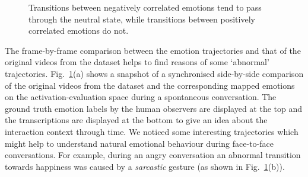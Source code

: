 \documentclass[10pt,journal,cspaper,compsoc]{IEEEtran}
\begin{document}
\begin{figure}[!htp]
\begin{center}
\end{center}
\caption{Transitions between negatively correlated emotions tend to pass through the neutral state, while transitions between positively correlated emotions do not.}
\label{fig_snapshots}
\end{figure}

The frame-by-frame comparison between the emotion trajectories and that of the original videos from the dataset helps to find reasons of some `abnormal' trajectories. Fig.~\ref{fig_snapshots}(a) shows a snapshot of a synchronised side-by-side comparison of the original videos from the dataset and the corresponding mapped emotions on the activation-evaluation space during a spontaneous conversation. The ground truth emotion labels by the human observers are displayed at the top and the transcriptions are displayed at the bottom to give an idea about the interaction context through time. We noticed some interesting trajectories which might help to understand natural emotional behaviour during face-to-face conversations. For example, during an angry conversation an abnormal transition towards happiness was caused by a \textit{sarcastic} gesture (as shown in Fig.~\ref{fig_snapshots}(b)).
\end{document}
